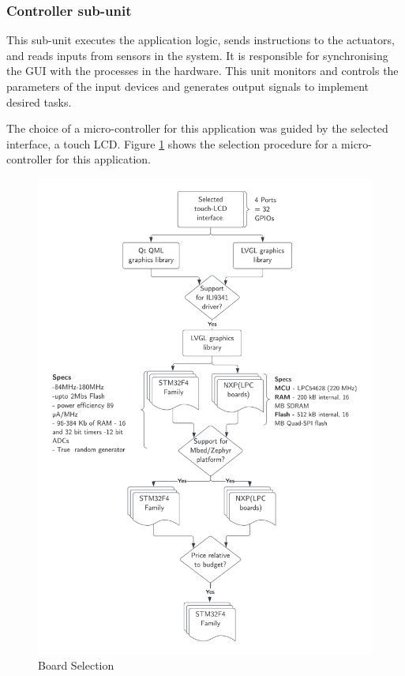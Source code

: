 \subsubsection{Controller sub-unit}
This sub-unit executes the application logic, sends instructions to the actuators, and reads inputs from sensors in the system. It is responsible for synchronising the GUI with the processes in the hardware. This unit monitors and controls the parameters of the input devices and generates output signals to implement desired tasks.
\par
The choice of a micro-controller for this application was guided by the selected interface, a touch LCD. Figure \ref{fig:mcu selection} shows the selection procedure for a micro-controller for this application.

\begin{figure}[H]
    \centering
    \includegraphics[width=\textwidth,height=\textheight, keepaspectratio]{Figures/BoardSelection.png}
    \caption{Board Selection}
    \label{fig:mcu selection}
\end{figure}

